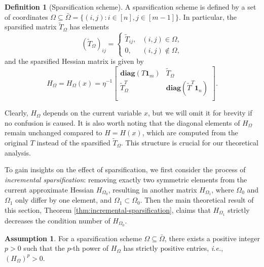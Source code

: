 \documentclass{article}
\theoremstyle{plain}
\theoremstyle{definition}
\newtheorem{definition}[theorem]{Definition}
\newtheorem{assumption}[theorem]{Assumption}
\theoremstyle{remark}
\begin{document}
\begin{definition}[Sparsification scheme]
\label{def:sparsification-scheme}
A sparsification scheme is defined by a set of coordinates $\Omega \subseteq \bar{\Omega} = \{(i, j): i \in [n], j \in [m-1] \}$. In particular, the sparsified matrix $\tilde{T}_{\Omega}$ has elements
\begin{equation*}
\label{eq:sparsified-T}
(\tilde{T}_{\Omega})_{ij} = \begin{cases}
\tilde{T}_{ij}, & (i,j)\in\Omega,\\
0, & (i,j)\notin\Omega,
\end{cases}
\end{equation*}
and the sparsified Hessian matrix is given by
\begin{equation*}
\label{eq:sparsified-Hessian}
H_{\Omega}=H_{\Omega}(x) = \eta^{-1}\begin{bmatrix}
    \mathbf{diag}(T \mathbf{1}_m) & \tilde{T}_{\Omega} \\
    \tilde{T}_{\Omega}^{T} & \mathbf{diag}(\tilde{T}^{T} \mathbf{1}_n) \\
    \end{bmatrix}.
\end{equation*}
\end{definition}
Clearly, $H_\Omega$ depends on the current variable $x$, but we will omit it for brevity if no confusion is caused.
It is also worth noting that the diagonal elements of $H_\Omega$ remain unchanged compared to $H=H(x)$, which are computed from the original $T$ instead of the sparsified $\tilde{T}_\Omega$. This structure is crucial for our theoretical analysis.

To gain insights on the effect of sparsification, we first consider the process of \emph{incremental sparsification}: removing exactly two symmetric elements from the current approximate Hessian $H_{\Omega_0}$, resulting in another matrix $H_{\Omega_1}$, where $\Omega_0$ and $\Omega_1$ only differ by one element, and $\Omega_1 \subset \Omega_0$.
Then the main theoretical result of this section, Theorem \ref{thm:incremental-sparsification}, claims that $H_{\Omega_1}$ strictly decreases the condition number of $H_{\Omega_0}$.

\begin{assumption} \label{assump:positive-power}
For a sparsification scheme $\Omega \subseteq \bar{\Omega}$, there exists a positive integer $p>0$ such that the $p$-th power of $H_\Omega$ has strictly positive entries, \emph{i.e.}, $(H_\Omega)^p > 0$.
\end{assumption}
\end{document}
